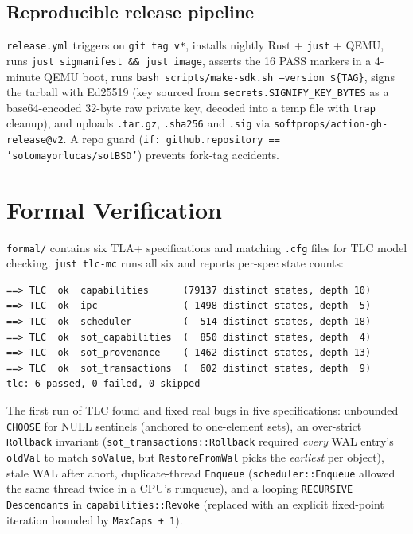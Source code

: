\documentclass[11pt,a4paper]{article}
\begin{document}
\subsection{Reproducible release pipeline}

\texttt{release.yml} triggers on \texttt{git tag v*}, installs nightly
Rust + \texttt{just} + QEMU, runs \texttt{just sigmanifest \&\& just
image}, asserts the 16 PASS markers in a 4-minute QEMU boot, runs
\texttt{bash scripts/make-sdk.sh --version \$\{TAG\}}, signs the
tarball with Ed25519 (key sourced from
\texttt{secrets.SIGNIFY\_KEY\_BYTES} as a base64-encoded 32-byte raw
private key, decoded into a temp file with \texttt{trap} cleanup),
and uploads \texttt{.tar.gz}, \texttt{.sha256} and \texttt{.sig} via
\texttt{softprops/action-gh-release@v2}. A repo guard
(\texttt{if: github.repository == 'sotomayorlucas/sotBSD'}) prevents
fork-tag accidents.

\section{Formal Verification}

\texttt{formal/} contains six TLA+ specifications and matching
\texttt{.cfg} files for TLC model checking. \texttt{just tlc-mc} runs
all six and reports per-spec state counts:

\begin{lstlisting}[language={}]
==> TLC  ok  capabilities      (79137 distinct states, depth 10)
==> TLC  ok  ipc               ( 1498 distinct states, depth  5)
==> TLC  ok  scheduler         (  514 distinct states, depth 18)
==> TLC  ok  sot_capabilities  (  850 distinct states, depth  4)
==> TLC  ok  sot_provenance    ( 1462 distinct states, depth 13)
==> TLC  ok  sot_transactions  (  602 distinct states, depth  9)
tlc: 6 passed, 0 failed, 0 skipped
\end{lstlisting}

The first run of TLC found and fixed real bugs in five specifications:
unbounded \texttt{CHOOSE} for NULL sentinels (anchored to one-element
sets), an over-strict \texttt{Rollback} invariant
(\texttt{sot\_transactions::Rollback} required \emph{every} WAL entry's
\texttt{oldVal} to match \texttt{soValue}, but \texttt{RestoreFromWal}
picks the \emph{earliest} per object), stale WAL after abort,
duplicate-thread \texttt{Enqueue} (\texttt{scheduler::Enqueue} allowed
the same thread twice in a CPU's runqueue), and a looping
\texttt{RECURSIVE Descendants} in \texttt{capabilities::Revoke}
(replaced with an explicit fixed-point iteration bounded by
\texttt{MaxCaps + 1}).
\end{document}
